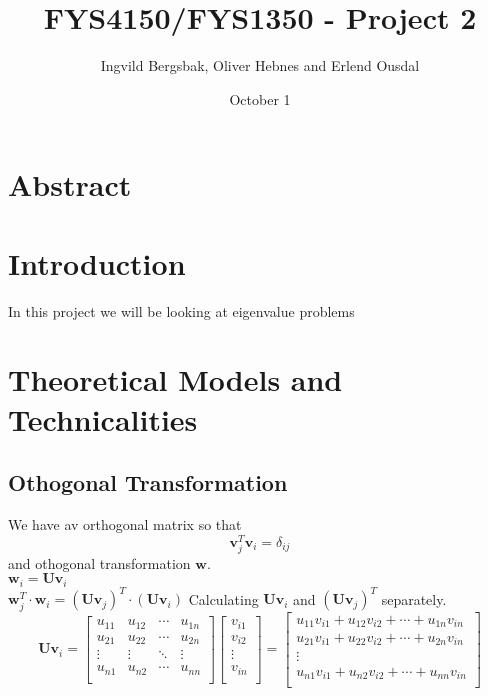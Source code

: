 \documentclass{article}
\title{\textbf{FYS4150/FYS1350 - Project 2}}
\author{Ingvild Bergsbak, Oliver Hebnes and Erlend Ousdal}
\date{October 1}
\begin{document}
\maketitle

\newpage

\section{Abstract}


\section{Introduction}

In this project we will be looking at eigenvalue problems

\section{Theoretical Models and Technicalities}

\subsection{Othogonal Transformation}
We have av orthogonal matrix so that
$$\mathbf{v}_j^T\mathbf{v}_i=\delta_{ij}$$
and othogonal transformation $\mathbf{w}$.\\
\vskip0.1cm
$\mathbf{w}_i=\mathbf{Uv}_i$\\
\vskip0.1cm
$\mathbf{w}_j^T\cdot \mathbf{w}_i=(\mathbf{Uv}_j)^T\cdot (\mathbf{Uv}_i)$
\vskip0.5cm
Calculating $\mathbf{Uv}_i$ and $(\mathbf{Uv}_j)^T$ separately.
\begin{equation*}
\mathbf{Uv}_i=\begin{bmatrix}
u_{11} & u_{12} & \cdots & u_{1n}\\
u_{21} & u_{22} & \cdots & u_{2n}\\
\vdots & \vdots & \ddots & \vdots\\
u_{n1} & u_{n2} & \cdots & u_{nn}\\
\end{bmatrix} \begin{bmatrix}
v_{i1} \\
v_{i2} \\
\vdots \\
v_{in} \\
\end{bmatrix}=\begin{bmatrix}
u_{11}v_{i1} + u_{12}v_{i2} + \cdots + u_{1n}v_{in}\\
u_{21}v_{i1} + u_{22}v_{i2} + \cdots + u_{2n}v_{in}\\
\vdots \\
u_{n1}v_{i1} +  u_{n2}v_{i2} + \cdots + u_{nn}v_{in}\\
\end{bmatrix}
\end{equation*}
\end{document}

